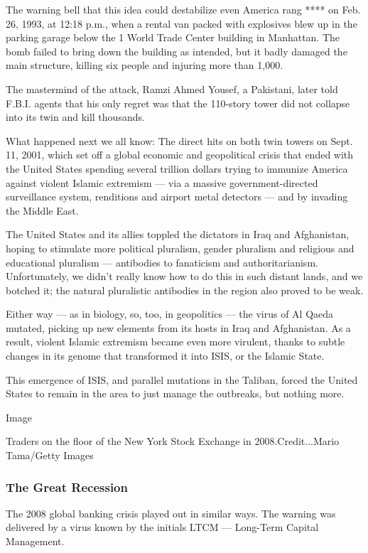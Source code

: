 The warning bell that this idea could destabilize even America rang ****
on Feb. 26, 1993, at 12:18 p.m., when a rental van packed with
explosives blew up in the parking garage below the 1 World Trade Center
building in Manhattan. The bomb failed to bring down the building as
intended, but it badly damaged the main structure, killing six people
and injuring more than 1,000.

The mastermind of the attack, Ramzi Ahmed Yousef, a Pakistani, later
told F.B.I. agents that his only regret was that the 110-story tower did
not collapse into its twin and kill thousands.

What happened next we all know: The direct hits on both twin towers on
Sept. 11, 2001, which set off a global economic and geopolitical crisis
that ended with the United States spending several trillion dollars
trying to immunize America against violent Islamic extremism --- via a
massive government-directed surveillance system, renditions and airport
metal detectors --- and by invading the Middle East.

The United States and its allies toppled the dictators in Iraq and
Afghanistan, hoping to stimulate more political pluralism, gender
pluralism and religious and educational pluralism --- antibodies to
fanaticism and authoritarianism. Unfortunately, we didn't really know
how to do this in such distant lands, and we botched it; the natural
pluralistic antibodies in the region also proved to be weak.

Either way --- as in biology, so, too, in geopolitics --- the virus of
Al Qaeda mutated, picking up new elements from its hosts in Iraq and
Afghanistan. As a result, violent Islamic extremism became even more
virulent, thanks to subtle changes in its genome that transformed it
into ISIS, or the Islamic State.

This emergence of ISIS, and parallel mutations in the Taliban, forced
the United States to remain in the area to just manage the outbreaks,
but nothing more.

Image

Traders on the floor of the New York Stock Exchange in
2008.Credit...Mario Tama/Getty Images

\hypertarget{the-great-recession}{%
\subsubsection{The Great Recession}\label{the-great-recession}}

The 2008 global banking crisis played out in similar ways. The warning
was delivered by a virus known by the initials LTCM --- Long-Term
Capital Management.

